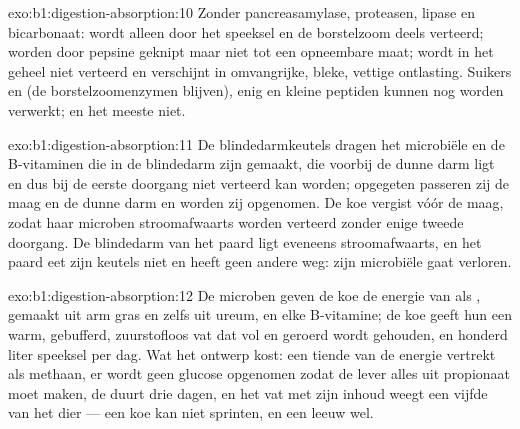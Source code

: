 \begin{solution}{exo:b1:digestion-absorption:10}
Zonder pancreasamylase, proteasen, lipase en bicarbonaat:  wordt
alleen door het speeksel en de borstelzoom deels verteerd;  worden
door pepsine geknipt maar niet tot een opneembare maat;  wordt in het
geheel niet verteerd en verschijnt in omvangrijke, bleke, vettige
ontlasting. Suikers en  (de borstelzoomenzymen blijven),
enig  en kleine peptiden kunnen nog worden verwerkt;  en het
meeste  niet.
\end{solution}

\begin{solution}{exo:b1:digestion-absorption:11}
De blindedarmkeutels dragen het microbiële  en de B-vitaminen die in
de blindedarm zijn gemaakt, die voorbij de dunne darm ligt en dus bij de
eerste doorgang niet verteerd kan worden; opgegeten passeren zij de maag en
de dunne darm en worden zij opgenomen. De koe vergist vóór de maag, zodat
haar microben stroomafwaarts worden verteerd zonder enige tweede doorgang.
De blindedarm van het paard ligt eveneens stroomafwaarts, en het paard eet
zijn keutels niet en heeft geen andere weg: zijn microbiële  gaat
verloren.
\end{solution}

\begin{solution}{exo:b1:digestion-absorption:12}
De microben geven de koe de energie van  als , 
gemaakt uit arm gras en zelfs uit ureum, en elke B-vitamine; de koe geeft
hun een warm, gebufferd, zuurstofloos vat dat vol en geroerd wordt
gehouden, en honderd liter speeksel per dag. Wat het ontwerp kost: een
tiende van de energie vertrekt als methaan, er wordt geen glucose
opgenomen zodat de lever alles uit propionaat moet maken, de 
duurt drie dagen, en het vat met zijn inhoud weegt een vijfde van het dier
--- een koe kan niet sprinten, en een leeuw wel.
\end{solution}

